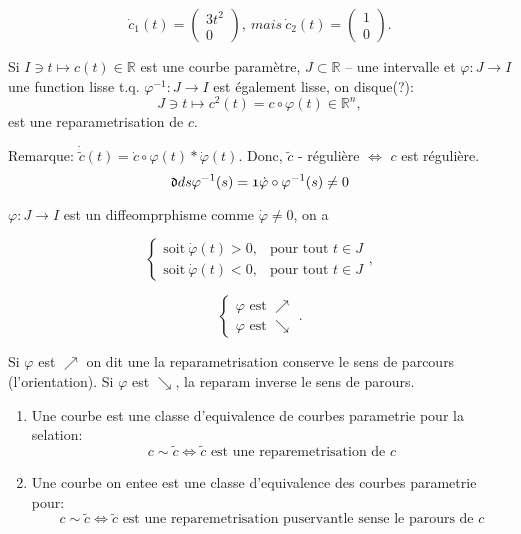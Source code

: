 $$ \dot{c}_1(t) = \left( \begin{array}{c} 3t^2 \\ 0 \end{array} \right),\ mais\ \dot{c}_2(t) = \left( \begin{array}{c} 1 \\ 0 \end{array} \right).$$

\begin{definition} Si $I\ni t \mapsto c(t)\in \mathbb{R}$ est une courbe paramètre, $J\subset \mathbb{R}$ -- une intervalle et $\varphi: J\rightarrow I$ une function lisse t.q. $\varphi^{-1}: J\rightarrow I$ est également lisse, on disque(?):
$$J\ni t \mapsto c^2(t) = c\circ\varphi(t) \in \mathbb{R}^n,$$
est une reparametrisation  de  $c$.
\end{definition}

Remarque:  
$\dot{\tilde{c}}(t)=\dot{c}\circ\varphi(t)*\dot{\varphi}(t)$. Donc,
$\tilde{c}$ - régulière $\Longleftrightarrow$ $c$ est régulière.
$$\frak{d}{ds}\varphi^{-1}(s)=\frak{1}{\dot{\varphi}\circ\varphi^{-1}(s)}\neq 0$$

$\varphi: J\rightarrow I$ est un diffeomprphisme comme $\dot{\varphi}\neq0$, on a

$$\left\{\begin{array}{rl}
\mbox{soit}\ \dot{\varphi}(t)>0, & \mbox{pour tout } t\in J \\ 
\mbox{soit}\ \dot{\varphi}(t)<0, & \mbox{pour tout } t\in J 
\end{array}\right.,$$

$$\left\{\begin{array}{rl}
\varphi\mbox{ est } \nearrow \\ 
\varphi\mbox{ est } \searrow
\end{array}\right..$$

Si $\varphi$ est $\nearrow$ on dit une la reparametrisation conserve le sens de parcours (l'orientation).
Si $\varphi$ est $\searrow$, la reparam inverse le sens de parours.

\begin{definition}
\begin{enumerate}
\item Une courbe est une classe d'equivalence de courbes parametrie pour la selation:
$$c\sim \tilde{c}\Longleftrightarrow\tilde{c}\mbox{ est une reparemetrisation de }c$$
\item Une courbe on entee est une classe d'equivalence des courbes parametrie pour:
$$c\sim \tilde{c}\Longleftrightarrow\tilde{c}\mbox{ est une reparemetrisation puservantle sense le parours de }c$$
\end{enumerate}
\end{definition}

